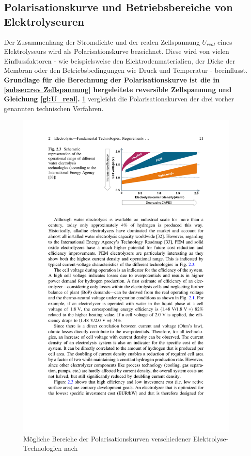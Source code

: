 \subsection{Polarisationskurve und Betriebsbereiche von Elektrolyseuren}
\label{subsec:Polarisationskurve}
Der Zusammenhang der Stromdichte und der realen Zellspannung $U_{real}$ eines Elektrolyseurs wird als Polarisationskurve bezeichnet. Diese wird von vielen Einflussfaktoren - wie beispielsweise den Elektrodenmaterialien, der Dicke der Membran oder den Betriebsbedingungen wie Druck und Temperatur - beeinflusst. \textbf{Grundlage für die Berechnung der Polarisationskurve ist die in \ref{subsec:rev Zellspannung} hergeleitete reversible Zellspannung und Gleichung \ref{gl:U_real}.} \ref{fig:PolarisationskurveElektrolyseure} vergleicht die Polarisationskurven der drei vorher genannten technischen Verfahren. 
\begin{figure}[h]
	\centering
		\includegraphics[scale=1]{Figures/PolarisationskurvenElektrolyseure}
		\caption{Mögliche Bereiche der Polarisationskurven verschiedener Elektrolyse-Technologien nach \cite{https://doi.org/10.1007/978-3-319-72459-1}}
\label{fig:PolarisationskurveElektrolyseure}	
\end{figure}

